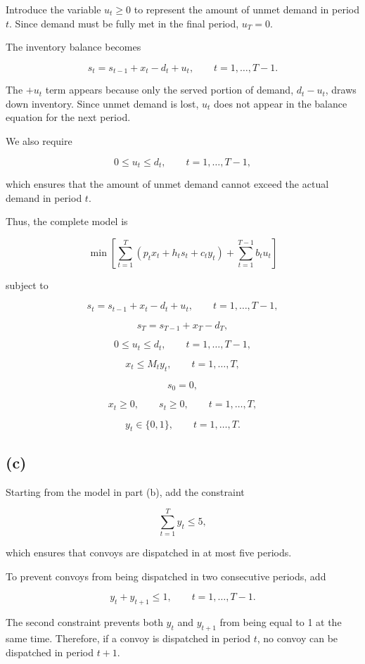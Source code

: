 \documentclass{article}
\begin{document}
Introduce the variable $u_t \geq 0$ to represent the amount of unmet demand in period $t$. Since demand must be fully met in the final period, $u_T=0$.

The inventory balance becomes

\[
s_t=s_{t-1}+x_t-d_t+u_t,
\qquad t=1,\ldots,T-1.
\]

The $+u_t$ term appears because only the served portion of demand, $d_t-u_t$, draws down inventory. Since unmet demand is lost, $u_t$ does not appear in the balance equation for the next period.

We also require

\[
0\leq u_t\leq d_t,
\qquad t=1,\ldots,T-1,
\]

which ensures that the amount of unmet demand cannot exceed the actual demand in period $t$.

Thus, the complete model is

\[
\min
\left[
\sum_{t=1}^{T}
\left(p_t x_t+h_t s_t+c_t y_t\right)
+
\sum_{t=1}^{T-1}b_tu_t
\right]
\]

subject to

\[
s_t=s_{t-1}+x_t-d_t+u_t,
\qquad t=1,\ldots,T-1,
\]

\[
s_T=s_{T-1}+x_T-d_T,
\]

\[
0\leq u_t\leq d_t,
\qquad t=1,\ldots,T-1,
\]

\[
x_t\leq M_ty_t,
\qquad t=1,\ldots,T,
\]

\[
s_0=0,
\]

\[
x_t\geq0,\qquad s_t\geq0,
\qquad t=1,\ldots,T,
\]

\[
y_t\in\{0,1\},
\qquad t=1,\ldots,T.
\]

\newpage 

\subsection*{(c)}

Starting from the model in part (b), add the constraint

\[
\sum_{t=1}^{T} y_t \leq 5,
\]

which ensures that convoys are dispatched in at most five periods.

To prevent convoys from being dispatched in two consecutive periods, add

\[
y_t+y_{t+1}\leq1,
\qquad t=1,\ldots,T-1.
\]

The second constraint prevents both $y_t$ and $y_{t+1}$ from being equal to 1 at the same time. Therefore, if a convoy is dispatched in period $t$, no convoy can be dispatched in period $t+1$.
\end{document}
